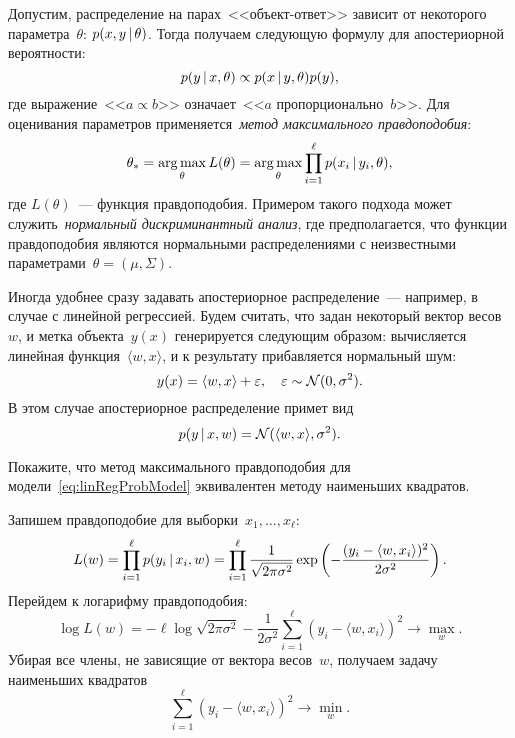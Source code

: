 \documentclass[12pt,fleqn]{article}
\begin{document}
Допустим, распределение на парах~<<объект-ответ>> зависит от
некоторого параметра~$\theta$: $p(x, y \mspace{3mu}{|}\mspace{3mu} \theta)$.
Тогда получаем следующую формулу для апостериорной вероятности:
\[
    p(y \mspace{3mu}{|}\mspace{3mu} x, \theta)
    \propto
    p(x \mspace{3mu}{|}\mspace{3mu} y, \theta) p(y),
\]
где выражение~<<$a \propto b$>> означает~<<$a$ пропорционально~$b$>>.
Для оценивания параметров применяется~\emph{метод максимального правдоподобия}:
\[
    \theta_*
    =
    \mathop{\rm arg\,max}\limits_\theta
        L(\theta)
    =
    \mathop{\rm arg\,max}\limits_\theta
        \prod_{i = 1}^{\ell} p(x_i \mspace{3mu}{|}\mspace{3mu} y_i, \theta),
\]
где $L(\theta)$~--- функция правдоподобия.
Примером такого подхода может служить~\emph{нормальный дискриминантный анализ},
где предполагается, что функции правдоподобия являются нормальными распределениями
с неизвестными параметрами~$\theta = (\mu, \Sigma)$.

Иногда удобнее сразу задавать апостериорное распределение~---
например, в случае с линейной регрессией.
Будем считать, что задан некоторый вектор весов~$w$,
и метка объекта~$y(x)$ генерируется следующим образом:
вычисляется линейная функция~$\langle w, x \rangle$,
и к результату прибавляется нормальный шум:
\[
    y(x) = \langle w, x \rangle + \varepsilon,
    \quad
    \varepsilon \sim \mathcal{N}(0, \sigma^2).
\]
В этом случае апостериорное распределение примет вид
\begin{equation}
\label{eq:linRegProbModel}
    p(y \mspace{3mu}{|}\mspace{3mu} x, w)
    =
    \mathcal{N}(\langle w, x \rangle, \sigma^2).
\end{equation}

\begin{vkProblem}
    Покажите, что метод максимального правдоподобия для
    модели~\eqref{eq:linRegProbModel} эквивалентен
    методу наименьших квадратов.
\end{vkProblem}

\begin{esSolution}
    Запишем правдоподобие для выборки~$x_1, \dots, x_\ell$:
    \[
        L(w)
        =
        \prod_{i = 1}^{\ell} p(y_i \mspace{3mu}{|}\mspace{3mu} x_i, w)
        =
        \prod_{i = 1}^{\ell}
            \frac{1}{\sqrt{2 \pi \sigma^2}}
            \exp\left(
                - \frac{(y_i - \langle w, x_i \rangle)^2}{2 \sigma^2}
            \right).
    \]
    Перейдем к логарифму правдоподобия:
    \[
        \log L(w)
        =
        -\ell \log \sqrt{2 \pi \sigma^2} -
        \frac{1}{2 \sigma^2} \sum_{i = 1}^{\ell} (y_i - \langle w, x_i \rangle)^2
        \to \max_w.
    \]
    Убирая все члены, не зависящие от вектора весов~$w$,
    получаем задачу наименьших квадратов
    \[
        \sum_{i = 1}^{\ell} (y_i - \langle w, x_i \rangle)^2 \to \min_w.
    \]
\end{esSolution}
\end{document}
